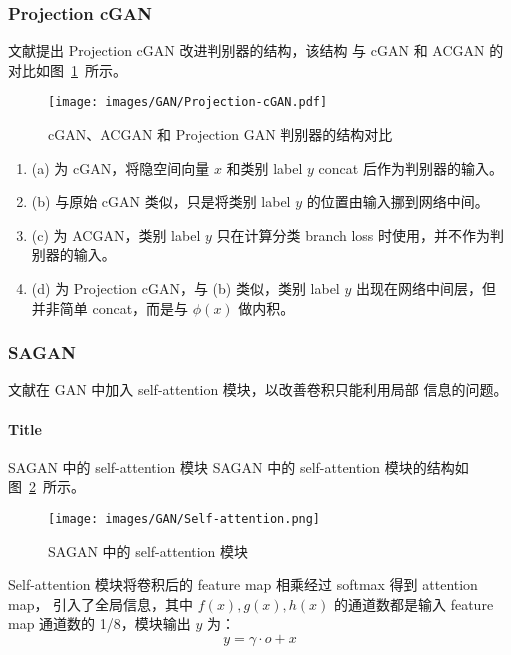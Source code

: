 \subsubsection{Projection cGAN}
文献提出 Projection cGAN 改进判别器的结构，该结构
与 cGAN 和 ACGAN 的对比如图~\ref{fig:projection-gan}~所示。

\begin{figure}[ht]
  \centering
  \texttt{[image: images/GAN/Projection-cGAN.pdf]}
  \caption{cGAN、ACGAN 和 Projection GAN 判别器的结构对比}
  \label{fig:projection-gan}
\end{figure}

\begin{enumerate}
  \item (a) 为 cGAN，将隐空间向量 $x$ 和类别 label $y$ concat 后作为判别器的输入。
  \item (b) 与原始 cGAN 类似，只是将类别 label $y$ 的位置由输入挪到网络中间。
  \item (c) 为 ACGAN，类别 label $y$ 只在计算分类 branch loss 时使用，并不作为判
    别器的输入。
  \item (d) 为 Projection cGAN，与 (b) 类似，类别 label $y$ 出现在网络中间层，但
    并非简单 concat，而是与 $\phi(x)$ 做内积。
\end{enumerate}

\subsubsection{SAGAN}
文献在 GAN 中加入 self-attention 模块，以改善卷积只能利用局部
信息的问题。

\paragraph{Title}{SAGAN 中的 self-attention 模块}
SAGAN 中的 self-attention 模块的结构如图~\ref{fig:self-attention}~所示。

\begin{figure}[ht]
  \centering
  \texttt{[image: images/GAN/Self-attention.png]}
  \caption{SAGAN 中的 self-attention 模块}
  \label{fig:self-attention}
\end{figure}

Self-attention 模块将卷积后的 feature map 相乘经过 softmax 得到 attention map，
引入了全局信息，其中 $f(x), g(x), h(x)$ 的通道数都是输入 feature map 通道数的
1/8，模块输出 $y$ 为：
\begin{equation}
  \label{equ:self-attention}
  y = \gamma \cdot o + x
\end{equation}

